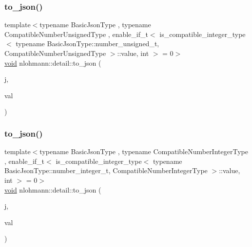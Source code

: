 \subsubsection{\texorpdfstring{to\_json()}{to\_json()}\hspace{0.1cm}{\footnotesize\ttfamily [5/17]}}
{\footnotesize\ttfamily template$<$typename Basic\+Json\+Type , typename Compatible\+Number\+Unsigned\+Type , enable\+\_\+if\+\_\+t$<$ is\+\_\+compatible\+\_\+integer\+\_\+type$<$ typename Basic\+Json\+Type\+::number\+\_\+unsigned\+\_\+t, Compatible\+Number\+Unsigned\+Type $>$\+::value, int $>$  = 0$>$ \\
\mbox{\hyperlink{namespacenlohmann_1_1detail_a59fca69799f6b9e366710cb9043aa77d}{void}} nlohmann\+::detail\+::to\+\_\+json (\begin{DoxyParamCaption}\item[{Basic\+Json\+Type \&}]{j,  }\item[{Compatible\+Number\+Unsigned\+Type}]{val }\end{DoxyParamCaption})\hspace{0.3cm}{\ttfamily [noexcept]}}

\mbox{\label{namespacenlohmann_1_1detail_a91fe576be579c8c2fdd14610605c6dd2}} 
\subsubsection{\texorpdfstring{to\_json()}{to\_json()}\hspace{0.1cm}{\footnotesize\ttfamily [6/17]}}
{\footnotesize\ttfamily template$<$typename Basic\+Json\+Type , typename Compatible\+Number\+Integer\+Type , enable\+\_\+if\+\_\+t$<$ is\+\_\+compatible\+\_\+integer\+\_\+type$<$ typename Basic\+Json\+Type\+::number\+\_\+integer\+\_\+t, Compatible\+Number\+Integer\+Type $>$\+::value, int $>$  = 0$>$ \\
\mbox{\hyperlink{namespacenlohmann_1_1detail_a59fca69799f6b9e366710cb9043aa77d}{void}} nlohmann\+::detail\+::to\+\_\+json (\begin{DoxyParamCaption}\item[{Basic\+Json\+Type \&}]{j,  }\item[{Compatible\+Number\+Integer\+Type}]{val }\end{DoxyParamCaption})\hspace{0.3cm}{\ttfamily [noexcept]}}

